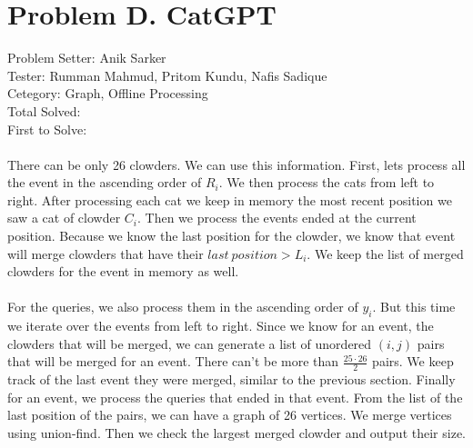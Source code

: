 \section*{Problem D. CatGPT}
Problem Setter: Anik Sarker \\
Tester: Rumman Mahmud, Pritom Kundu, Nafis Sadique \\
Cetegory: Graph, Offline Processing \\
Total Solved:  \\
First to Solve: \\
\\
There can be only 26 clowders. We can use this information. First, lets process
all the event in the ascending order of $R_i$. We then process the cats from left
to right. After processing each cat we keep in memory the most recent position we 
saw a cat of clowder $C_i$. Then we process the events ended at the current position.
Because we know the last position for the clowder, we know that event will merge
clowders that have their $last\ position > L_i$. We keep the list of merged clowders
for the event in memory as well.\\
\\
For the queries, we also process them in the ascending order of $y_i$. But this time we 
iterate over the events from left to right. Since we know for an event, the clowders that
will be merged, we can generate a list of unordered $(i,j)$ pairs that will be merged for
an event. There can't be more than $\frac{25 \cdot 26}{2}$ pairs. We keep track of the last event
they were merged, similar to the previous section. Finally for an event, we process the 
queries that ended in that event. From the list of the last position of the pairs, we
can have a graph of 26 vertices. We merge vertices using union-find. Then we check the largest
merged clowder and output their size.
